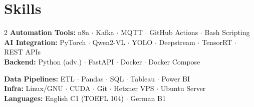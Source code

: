 \documentclass[10pt,a4paper]{article}
\begin{document}
\section{Skills}
\begin{multicols}{2}
\small\noindent
{\color{accent}\bfseries Automation Tools:} n8n $\cdot$ Kafka $\cdot$ MQTT $\cdot$ GitHub Actions $\cdot$ Bash Scripting\\[1pt]
{\color{accent}\bfseries AI Integration:} PyTorch $\cdot$ Qwen2-VL $\cdot$ YOLO $\cdot$ Deepstream $\cdot$ TensorRT $\cdot$ REST APIs\\[1pt]
{\color{accent}\bfseries Backend:} Python (adv.) $\cdot$ FastAPI $\cdot$ Docker $\cdot$ Docker Compose

\columnbreak
{\color{accent}\bfseries Data Pipelines:} ETL $\cdot$ Pandas $\cdot$ SQL $\cdot$ Tableau $\cdot$ Power BI\\[1pt]
{\color{accent}\bfseries Infra:} Linux/GNU $\cdot$ CUDA $\cdot$ Git $\cdot$ Hetzner VPS $\cdot$ Ubuntu Server\\[1pt]
{\color{accent}\bfseries Languages:} English C1 (TOEFL 104) $\cdot$ German B1
\end{multicols}
\end{document}
